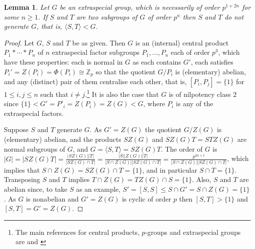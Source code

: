 \documentclass{amsart}
\theoremstyle{observation}
\newtheorem{lemma}[theorem]{Lemma}
\theoremstyle{definition}
\theoremstyle{remark}
\numberwithin{equation}{section}
\begin{document}
\begin{lemma}\label{LemExspSub} Let $G$ be an extraspecial group, which is necessarily of order $p^{1 + 2n}$ for some $n \geq 1$. If $S$ and $T$ are two subgroups of $G$ of order $p^n$ then $S$ and $T$ do not generate $G$, that is, $\langle S, T \rangle < G$.
\end{lemma}
\begin{proof} Let $G$, $S$ and $T$ be as given. Then $G$ is an (internal) central product $P_1 * \cdots * P_n$ of $n$ extraspecial factor subgroups $P_1,\ldots,P_n$ each of order $p^3$, which have these properties: each is normal in $G$ as each contains $G'$, each satisfies $P_i' = Z(P_i) = \Phi(P_i) \cong \mathbb{Z}_p$ so that the quotient $G/P_i$ is (elementary) abelian, and any (distinct) pair of them centralise each other, that is, $[P_i, P_j] = \{1\}$ for $1 \leq i, j \leq n$ such that $i \neq j$.\footnote{The main references for central products, $p$-groups and extraspecial groups are \citep[Chapter 3]{Cra} and \citep[Chapter 4]{Ber}} It is also the case that $G$ is of nilpotency class $2$ since $\{1\} < G' = P'_i = Z(P_i) = Z(G) < G$, where $P_i$ is any of the extraspecial factors.

\vspace{1mm}

Suppose $S$ and $T$ generate $G$. As $G' = Z(G)$ the quotient $G/Z(G)$ is (elementary) abelian, and the products $SZ(G)$ and $SZ(G)T = STZ(G)$ are normal subgroups of $G$, and $G = \langle S, T \rangle = SZ(G)T$. The order of $G$ is $|G| = |SZ(G)T| = \frac{|SZ(G)||T|}{|SZ(G) \cap T|} = \frac{|S||Z(G)||T|}{|S \cap Z(G)||SZ(G) \cap T|} = \frac{p^{2n + 1}}{|S \cap Z(G)||SZ(G) \cap T|}$, which implies that $S \cap Z(G) = SZ(G) \cap T = \{1\}$, and in particular $S \cap T = \{1\}$. Transposing $S$ and $T$ implies $T \cap Z(G) = TZ(G) \cap S = \{1\}$. Also, $S$ and $T$ are abelian since, to take $S$ as an example, $S' = [S, S] \leq S \cap G' = S \cap Z(G) = \{1\}$. As $G$ is nonabelian and $G' = Z(G)$ is cyclic of order $p$ then $[S, T] > \{1\}$ and $[S, T] = G' = Z(G)$.

\vspace{1mm}


\end{proof}
\end{document}
